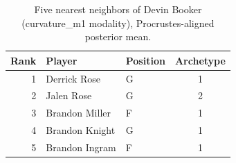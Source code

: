 \begin{table}[htbp]
  \centering\small
  \begin{tabular}{rllc}
    \toprule
    Rank & Player & Position & Archetype \\
    \midrule
    1 & Derrick Rose & G & 1 \\
    2 & Jalen Rose & G & 2 \\
    3 & Brandon Miller & F & 1 \\
    4 & Brandon Knight & G & 1 \\
    5 & Brandon Ingram & F & 1 \\
    \bottomrule
  \end{tabular}
  \caption{Five nearest neighbors of Devin Booker (curvature_m1 modality), Procrustes-aligned posterior mean.}
  \label{tab:Devin_Booker_neighbors_curvature_m1}
\end{table}

